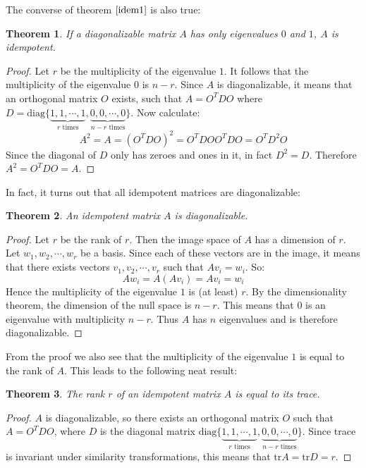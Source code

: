 \documentclass[12pt, a4paper]{article}
\newtheorem{theorem}{Theorem}
\begin{document}
The converse of theorem $\ref{idem1}$ is also true:
\begin{theorem}
If a diagonalizable matrix $A$ has only eigenvalues $0$ and $1$, $A$ is idempotent.
\end{theorem}
\begin{proof}
Let $r$ be the multiplicity of the eigenvalue $1$. It follows that the multiplicity of the eigenvalue $0$ is $n-r$. Since $A$ is diagonalizable, it means that an orthogonal matrix $O$ exists, such that $A=O^TDO$ where $D=\textrm{diag}\{\underbrace{1, 1, \cdots, 1}_{r\textrm{ times}},\underbrace{0, 0,\cdots, 0}_{n-r\textrm{ times}}\}$. Now calculate:
\begin{equation}
A^2=A=(O^TDO)^2=O^TDOO^TDO=O^TD^2O
\end{equation}
Since the diagonal of $D$ only has zeroes and ones in it, in fact $D^2=D$. Therefore $A^2=O^TDO=A$.
\end{proof}

In fact, it turns out that all idempotent matrices are diagonalizable:

\begin{theorem}
An idempotent matrix $A$ is diagonalizable.
\end{theorem}
\begin{proof}
Let $r$ be the rank of $r$. Then the image space of $A$ has a dimension of $r$. Let ${w_1, w_2,\cdots,w_r}$ be a basis. Since each of these vectors are in the image, it means that there exists vectors $v_1, v_2,\cdots, v_r$ such that $Av_i=w_i$. So:
\begin{equation}
Aw_i=A(Av_i)=Av_i=w_i 
\end{equation}
Hence the multiplicity of the eigenvalue $1$ is (at least) $r$. By the dimensionality theorem, the dimension of the null space is $n-r$. This means that $0$ is an eigenvalue with multiplicity $n-r$. Thus $A$ has $n$ eigenvalues and is therefore diagonalizable.
\end{proof}

From the proof we also see that the multiplicity of the eigenvalue $1$ is equal to the rank of $A$. This leads to the following neat result:

\begin{theorem}
The rank $r$ of an idempotent matrix $A$ is equal to its trace.
\end{theorem}
\begin{proof}
$A$ is diagonalizable, so there exists an orthogonal matrix $O$ such that $A=O^TDO$, where $D$ is the diagonal matrix $\textrm{diag}\{\underbrace{1, 1, \cdots, 1}_{r\textrm{ times}},\underbrace{0, 0,\cdots, 0}_{n-r\textrm{ times}}\}$.
Since trace is invariant under similarity transformations, this means that $\textrm{tr}A=\textrm{tr}D=r$.
\end{proof}
\end{document}
